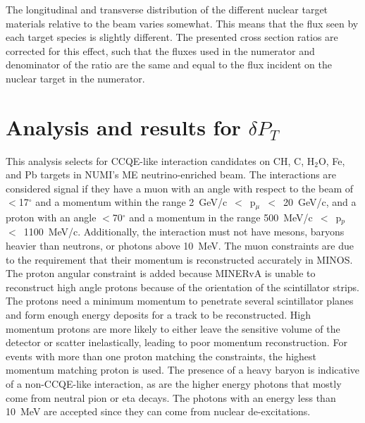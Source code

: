 \documentclass[aps,prd,twocolumn,showpacs,superscriptaddress,floatfix]{revtex4-2}  %
\newcommand{\tkidelta}{\ensuremath{\delta P_{T}}\xspace}
\begin{document}
The longitudinal and transverse distribution of the different nuclear target materials relative to the beam varies somewhat.  This means that the flux seen by each target species is slightly different.  The presented cross section ratios are corrected for this effect, such that the fluxes used in the numerator and denominator of the ratio are the same and equal to the flux incident on the nuclear target in the numerator.


\section{Analysis and results for \tkidelta }
\label{sec:analysis}
This analysis  
selects for CCQE-like interaction candidates on CH, C, H$_2$O, Fe, and Pb targets in NUMI's ME neutrino-enriched beam. The interactions are considered signal if they have a muon with an angle with respect to the beam of $<$17$^{\circ}$ and a momentum within the range 2~GeV/c~$<$~p$_{\mu}$~$<$~20~GeV/c, and a proton with an angle $<$70$^{\circ}$ and a momentum in the range 500~MeV/c~$<$~p$_{p}$~$<$~1100~MeV/c. Additionally, the interaction must not have mesons, baryons heavier than neutrons, 
or photons above 10~MeV. The muon constraints are due to the requirement that their momentum is reconstructed accurately in MINOS. The proton angular constraint is added because MINERvA is unable to reconstruct high angle protons because of the orientation of  the scintillator strips. 
The protons need a 
minimum momentum to penetrate several scintillator planes and form enough energy deposits for a track to be reconstructed.
High momentum protons are more likely to either leave the sensitive volume of the detector or scatter inelastically, leading to poor momentum reconstruction. 
For events with more than one  
proton matching the constraints, the highest momentum 
matching proton 
is used.  The presence of a heavy baryon is indicative of a non-CCQE-like interaction, as are the higher energy photons that mostly come from neutral pion or eta decays.  The photons with an energy less than 10~MeV are accepted since they can come from nuclear de-excitations.
\end{document}
